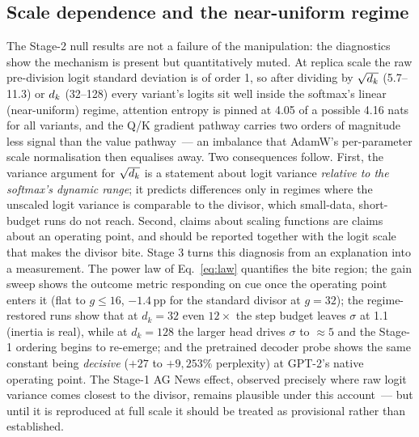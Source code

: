 \subsection{Scale dependence and the near-uniform regime}\label{sec:scale}
The Stage-2 null results are not a failure of the manipulation: the
diagnostics show the mechanism is present but quantitatively muted. At replica
scale the raw pre-division logit standard deviation is of order 1, so after
dividing by $\sqrt{d_k}$ (5.7--11.3) or $d_k$ (32--128) every variant's logits
sit well inside the softmax's linear (near-uniform) regime, attention entropy
is pinned at 4.05 of a possible 4.16 nats for all variants, and the Q/K
gradient pathway carries two orders of magnitude less signal than the value
pathway~--- an imbalance that AdamW's per-parameter scale normalisation then
equalises away. Two consequences follow. First, the variance argument for
$\sqrt{d_k}$ is a statement about logit variance \emph{relative to the
softmax's dynamic range}; it predicts differences only in regimes where the
unscaled logit variance is comparable to the divisor, which small-data,
short-budget runs do not reach. Second, claims about scaling functions are
claims about an operating point, and should be reported together with the
logit scale that makes the divisor bite.
Stage 3 turns this diagnosis from an explanation into a measurement. The
power law of Eq.~\eqref{eq:law} quantifies the bite region; the gain sweep
shows the outcome metric responding on cue once the operating point enters it
(flat to $g \le 16$, $-1.4$\,pp for the standard divisor at $g = 32$); the
regime-restored runs show that at $d_k = 32$ even $12\times$ the step budget
leaves $\sigma$ at 1.1 (inertia is real), while at $d_k = 128$ the larger
head drives $\sigma$ to $\approx 5$ and the Stage-1 ordering begins to
re-emerge; and the pretrained decoder probe shows the same constant being
\emph{decisive} ($+27$ to $+9{,}253\%$ perplexity) at GPT-2's native
operating point. The Stage-1 AG News effect, observed precisely where raw
logit variance comes closest to the divisor, remains plausible under this
account~--- but until it is reproduced at full scale it should be treated as
provisional rather than established.

